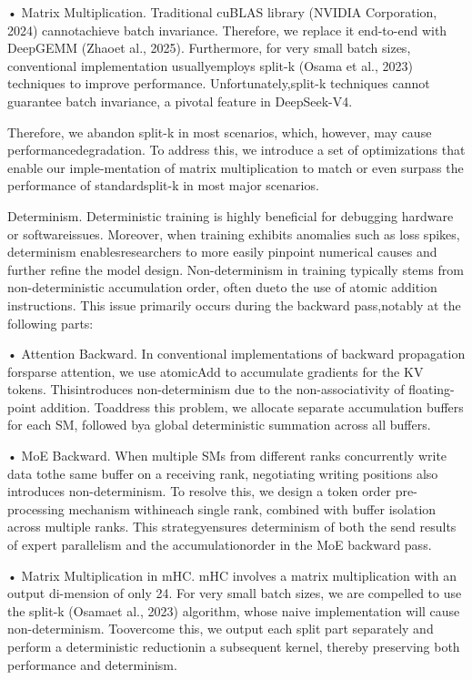\documentclass[
  10
]{article}
\begin{document}
• Matrix Multiplication. Traditional cuBLAS library (NVIDIA Corporation,
2024) cannotachieve batch invariance. Therefore, we replace it
end-to-end with DeepGEMM (Zhaoet al., 2025). Furthermore, for very small
batch sizes, conventional implementation usuallyemploys split-k (Osama
et al., 2023) techniques to improve performance. Unfortunately,split-k
techniques cannot guarantee batch invariance, a pivotal feature in
DeepSeek-V4.

Therefore, we abandon split-k in most scenarios, which, however, may
cause performancedegradation. To address this, we introduce a set of
optimizations that enable our imple-mentation of matrix multiplication
to match or even surpass the performance of standardsplit-k in most
major scenarios.

Determinism. Deterministic training is highly beneficial for debugging
hardware or softwareissues. Moreover, when training exhibits anomalies
such as loss spikes, determinism enablesresearchers to more easily
pinpoint numerical causes and further refine the model design.
Non-determinism in training typically stems from non-deterministic
accumulation order, often dueto the use of atomic addition instructions.
This issue primarily occurs during the backward pass,notably at the
following parts:

• Attention Backward. In conventional implementations of backward
propagation forsparse attention, we use atomicAdd to accumulate
gradients for the KV tokens. Thisintroduces non-determinism due to the
non-associativity of floating-point addition. Toaddress this problem, we
allocate separate accumulation buffers for each SM, followed bya global
deterministic summation across all buffers.

• MoE Backward. When multiple SMs from different ranks concurrently
write data tothe same buffer on a receiving rank, negotiating writing
positions also introduces non-determinism. To resolve this, we design a
token order pre-processing mechanism withineach single rank, combined
with buffer isolation across multiple ranks. This strategyensures
determinism of both the send results of expert parallelism and the
accumulationorder in the MoE backward pass.

• Matrix Multiplication in mHC. mHC involves a matrix multiplication
with an output di-mension of only 24. For very small batch sizes, we are
compelled to use the split-k (Osamaet al., 2023) algorithm, whose naive
implementation will cause non-determinism. Toovercome this, we output
each split part separately and perform a deterministic reductionin a
subsequent kernel, thereby preserving both performance and determinism.
\end{document}
